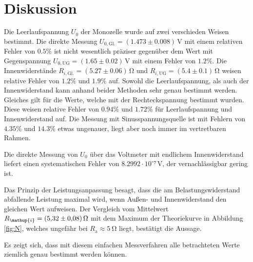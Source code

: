 \section{Diskussion}
\label{sec:Diskussion}
Die Leerlaufspannung $U_0$ der Monozelle wurde auf zwei verschieden Weisen bestimmt. Die direkte Messung $U_{0,\mathup{Gl.}}=(1.473\pm0.008)\,\si\volt$ mit einem relativen Fehler von $0.5\%$ ist nicht wesentlich präziser gegenüber dem Wert mit Gegenspannung $U_{0,\mathup{UG}}=(1.65\pm0.02)\,\si\volt$ mit einem Fehler von $1.2\%$. 
Die Innenwiderstände  $R_{i,\mathup{Gl.}}=(5.27\pm0.06)\,\si\ohm$ und $R_{i,\mathup{UG}}=(5.4\pm0.1)\,\si\ohm$ weisen relative Fehler von $1.2\%$ und $1.9\%$ auf.
Sowohl die Leerlaufspannung, als auch der Innenwiderstand kann anhand beider Methoden sehr genau bestimmt werden.
Gleiches gilt für die Werte, welche mit der Rechteckspannung bestimmt wurden. Diese weisen relative Fehler von $0.94\%$ und $1.72\%$ für Leerlaufspannung und Innenwiderstand auf. Die Messung mit Sinusspannungsquelle ist mit Fehlern von $4.35\%$ und $14.3\%$ etwas ungenauer, liegt aber noch immer im vertretbaren Rahmen.

Die direkte Messung von $U_0$ über das Voltmeter mit endlichem Innenwiderstand liefert einen systematischen Fehler von $8.2992\cdot10⁻⁷\,\si{\volt}$, der vernachlässigbar gering ist.

Das Prinzip der Leistungsanpassung besagt, dass die am Belastungswiderstand abfallende Leistung maximal wird, wenn Außen- und Innenwiderstand den gleichen Wert aufweisen.
 Der Vergleich vom Mittelwert $R_\mathup{i}=\SI{5.32\pm0.08}{\ohm}$ mit dem Maximum der Theoriekurve in Abbildung \ref{fig:N}, welches ungefähr bei $R_\mathup{a}\approx\SI{5}{\ohm}$ liegt, bestätigt die Aussage.

Es zeigt sich, dass mit diesem einfachen Messverfahren alle betrachteten Werte ziemlich genau bestimmt werden können.

